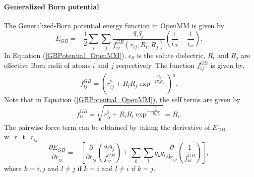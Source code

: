 \documentclass[12pt]{article}
\begin{document}
\paragraph{Generalized Born potential}
The Generalized-Born potential energy function in OpenMM is given by
\begin{equation}
\label{GBPotential_OpenMM}
E_{GB} = -\frac{1}{2}\displaystyle\sum_{i}\displaystyle\sum_{j}\frac{q_{i}q_{j}}{f_{ij}^{GB}(r_{ij},R_{i},R_{j})}\left(
\frac{1}{{\epsilon}_{S}} - \frac{1}{{\epsilon}_{w}}\right).
\end{equation}
In Equation (\ref{GBPotential_OpenMM}), ${\epsilon}_{S}$ is the solute dielectric,
$R_{i}$ and $R_{j}$ are effective Born radii of atoms $i$ and $j$ respectively.
The function
$f_{ij}^{GB}$ is given by,
\begin{equation}
\label{fGBEq}
f_{ij}^{GB} = (r_{ij}^{2} + R_{i}R_{j}\exp^{-\frac{r_{ij}^{2}}{4R_{i}R_{j}}})^{\frac{1}{2}}.
\end{equation}
Note that in Equation (\ref{GBPotential_OpenMM}), the self terms are given by
\begin{equation}
\label{eq:fGBself}
f_{ii}^{GB} = \sqrt{r_{ii}^{2} + R_{i}R_{i}\exp^{-\frac{r_{ii}^{2}}{4R_{i}R_{i}}}} = R_{i}.
\end{equation}
The pairwise force term can be obtained by taking the derivative of $E_{GB}$ w.~r.~t.~$r_{ij}$.
\begin{equation}
\label{eq:EGBderv1}
\frac{\partial E_{GB}}{\partial r_{ij}} = - \left[ \frac{\partial}{\partial r_{ij}}\left(\frac{q_{i}q_{j}}{f_{ij}^{GB}} \right) + \displaystyle\sum_{k}\displaystyle\sum_{l}q_{k}q_{l}\frac{\partial}{\partial r_{ij}}\left(\frac{1}{f_{kl}^{GB}}\right)\right],
\end{equation}
where $k=i,j$ and $l{\neq}j$ if $k=i$ and $l{\neq}i$ if $k=j$.
\end{document}
